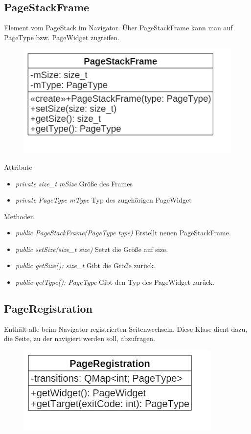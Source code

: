 \subsection*{PageStackFrame}
Element vom PageStack im Navigator. Über PageStackFrame kann man auf PageType bzw. PageWidget zugreifen.

\begin{figure}[H]
\centering
\includegraphics[scale=0.5]{img/Klassendiagramm/Klassen/Controller/PageStackFrame}
\label{fig:pageStackFrame}
\end{figure}

Attribute
\begin{itemize}
	\item\textit{private size\_t mSize}
	Größe des Frames
	\item\textit{private PageType mType}
	Typ des zugehörigen PageWidget
\end{itemize}

Methoden
\begin{itemize}
	\item\textit{public PageStackFrame(PageType type)}
	Erstellt neuen PageStackFrame.
	\item\textit{public setSize(size\_t size)}
	Setzt die Größe auf size.
	\item\textit{public getSize(): size\_t}
	Gibt die Größe zurück.
	\item\textit{public getType(): PageType}
	Gibt den Typ des PageWidget zurück.
\end{itemize}

\subsection*{PageRegistration}
Enthält alle beim Navigator registrierten Seitenwechseln. Diese Klase dient dazu, die Seite, zu der navigiert werden soll, abzufragen.

\begin{figure}[H]
\centering
\includegraphics[scale=0.5]{img/Klassendiagramm/Klassen/Controller/PageRegistration}
\label{fig:pageRegistration}
\end{figure}


